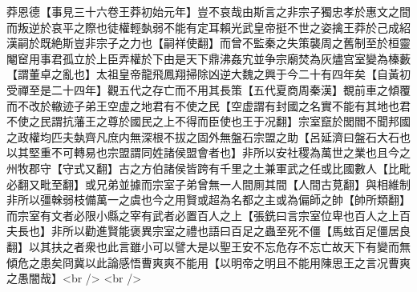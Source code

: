 莽恩德【事見三十六卷王莽初始元年】豈不哀哉由斯言之非宗子獨忠孝於惠文之間而叛逆於哀平之際也徒權輕埶弱不能有定耳賴光武皇帝挺不世之姿擒王莽於己成紹漢嗣於既絶斯豈非宗子之力也【嗣祥使翻】而曾不監秦之失策襲周之舊制至於桓靈閹䆠用事君孤立於上臣弄權於下由是天下鼎沸姦宄並争宗廟焚為灰燼宫室變為榛藪【謂董卓之亂也】太祖皇帝龍飛鳳翔掃除凶逆大魏之興于今二十有四年矣【自黃初受禪至是二十四年】觀五代之存亡而不用其長策【五代夏商周秦漢】覩前車之傾覆而不改於轍迹子弟王空虚之地君有不使之民【空虚謂有封國之名實不能有其地也君不使之民謂抗藩王之尊於國民之上不得而臣使也王于况翻】宗室竄於閭閻不聞邦國之政權均匹夫埶齊凡庶内無深根不拔之固外無盤石宗盟之助【呂延濟曰盤石大石也以其堅重不可轉易也宗盟謂同姓諸侯盟會者也】非所以安社稷為萬世之業也且今之州牧郡守【守式又翻】古之方伯諸侯皆跨有千里之土兼軍武之任或比國數人【比毗必翻又毗至翻】或兄弟並據而宗室子弟曾無一人間厠其間【人間古莧翻】與相維制非所以彊榦弱枝備萬一之虞也今之用賢或超為名都之主或為偏師之帥【帥所類翻】而宗室有文者必限小縣之宰有武者必置百人之上【張銑曰言宗室位卑也百人之上百夫長也】非所以勸進賢能褒異宗室之禮也語曰百足之蟲至死不僵【馬蚿百足僵居良翻】以其扶之者衆也此言雖小可以譬大是以聖王安不忘危存不忘亡故天下有變而無傾危之患矣冏冀以此論感悟曹爽爽不能用【以明帝之明且不能用陳思王之言况曹爽之愚闇哉】<br />
<br />
